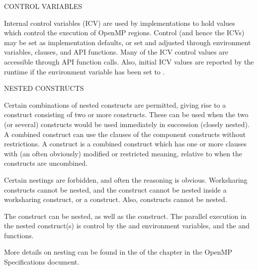 \bigskip
CONTROL VARIABLES 

  Internal control variables (ICV) are used by implementations to hold values which control the execution
  of OpenMP regions.  Control (and hence the ICVs) may be set as implementation defaults, 
  or set and adjusted through environment variables, clauses, and API functions.  Many of the ICV control
  values are accessible through API function calls.  Also, initial ICV values are reported by the runtime
  if the  environment variable has been set to . 


\bigskip
NESTED CONSTRUCTS

Certain combinations of nested constructs are permitted, giving rise to a  construct
consisting of two or more constructs.  These can be used when the two (or several) constructs would be used
immediately in succession (closely nested). A combined construct can use the clauses of the component
constructs without restrictions.
A  construct is a combined construct which has one or more clauses with (an often obviously)
modified or restricted meaning, relative to when the constructs are uncombined. %


Certain nestings are forbidden, and often the reasoning is obvious.  Worksharing constructs cannot be nested, and
the  construct cannot be nested inside a worksharing construct, or a  construct. 
Also,  constructs cannot be nested.  

The  construct can be nested, as well as the  construct.  The parallel
execution in the nested  construct(s) is control by the  and 
 environment variables, and the  and 
 functions.

More details on nesting can be found in the  of the  
chapter in the OpenMP Specifications document.
